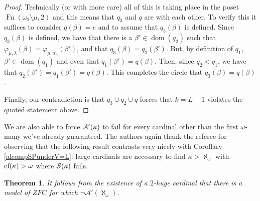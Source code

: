\documentclass{amsart}
\theoremstyle{plain}
\newtheorem{theorem}{Theorem}
\theoremstyle{definition}
\theoremstyle{remark}
\theoremstyle{plain}
\theoremstyle{definition}
\theoremstyle{remark}
\begin{document}
\begin{proof}
            Technically (or with more care)  all of this is taking place in the
            poset $\operatorname{Fn}(\omega_2\setminus \mu,2)$ and this means
            that $q_3$ and $q$ are  with each other.
            To verify this it suffices to consider
             $q(\beta)=e$ and to assume that $q_3(\beta)$ is defined.
            Since $q_3(\beta)$ is defined, we have that
            there is a  $\beta'\in\mathop{dom}(q_2)$ such that $
             \varphi_{\mu,\lambda}(\beta) = \varphi_{\mu,\alpha_n}(\beta')$,
            and that $q_3(\beta) = q_2(\beta')$.
            But, by definition of $q_1$, $\beta'\in\mathop{dom}(q_1)$
            and even  that $q_1(\beta') = q(\beta)$.
             Then, since $q_2<q_1$, we have that $q_2(\beta')=q_1(\beta') =
             q(\beta)$. This completes the circle that $q_3(\beta) = q(\beta)$.


            Finally, our contradiction is that $q_3\cup q_2\cup q$
            forces that
             $k=L+1$ violates the quoted statement above.
            \end{proof}


  We are also able to force \(\mathcal{A}'(\kappa)\) to fail for every cardinal
  other than the first \(\omega\)-many we've already guaranteed. The authors
  again thank the referee for observing that the following result
  contrasts very nicely with Corollary \ref{alcompSPunderV=L}: large cardinals
  are necessary to find \(\kappa>\aleph_\omega\) with \(\textrm{cf}(\kappa)>\omega\)
  where \(\mathcal{S}(\kappa)\) fails.


            \begin{theorem} It follows from the existence of a $2$-huge cardinal
            that there is a model of $ZFC$ for which $\lnot \mathcal A'(\aleph_{\omega})$.
            \end{theorem}
\end{document}
